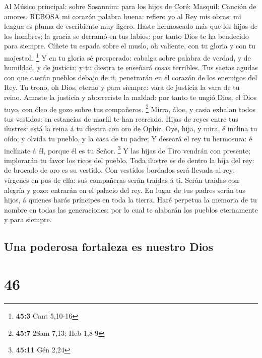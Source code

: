  Al Músico principal: sobre Sosannim: para los hijos de
Coré: Masquil: Canción de amores. REBOSA mi corazón palabra buena:
refiero yo al Rey mis obras: mi lengua es pluma de escribiente muy
ligero.  Haste hermoseado más que los hijos de los hombres;
la gracia se derramó en tus labios: por tanto Dios te ha bendecido para
siempre.  Cíñete tu espada sobre el muslo, oh valiente, con
tu gloria y con tu majestad. \footnote{\textbf{45:3} Cant 5,10-16}
 Y en tu gloria sé prosperado: cabalga sobre palabra de
verdad, y de humildad, y de justicia; y tu diestra te enseñará cosas
terribles.  Tus saetas agudas con que caerán pueblos debajo
de ti, penetrarán en el corazón de los enemigos del Rey.  Tu
trono, oh Dios, eterno y para siempre: vara de justicia la vara de tu
reino.  Amaste la justicia y aborreciste la maldad: por
tanto te ungió Dios, el Dios tuyo, con óleo de gozo sobre tus
compañeros. \footnote{\textbf{45:7} 2Sam 7,13; Heb 1,8-9} 
Mirra, áloe, y casia exhalan todos tus vestidos: en estancias de marfil
te han recreado.  Hijas de reyes entre tus ilustres: está la
reina á tu diestra con oro de Ophir.  Oye, hija, y mira, é
inclina tu oído; y olvida tu pueblo, y la casa de tu padre;
 Y deseará el rey tu hermosura: é inclínate á él, porque él
es tu Señor. \footnote{\textbf{45:11} Gén 2,24}  Y las
hijas de Tiro vendrán con presente; implorarán tu favor los ricos del
pueblo.  Toda ilustre es de dentro la hija del rey: de
brocado de oro es su vestido.  Con vestidos bordados será
llevada al rey; vírgenes en pos de ella: sus compañeras serán traídas á
ti.  Serán traídas con alegría y gozo: entrarán en el
palacio del rey.  En lugar de tus padres serán tus hijos, á
quienes harás príncipes en toda la tierra.  Haré perpetua
la memoria de tu nombre en todas las generaciones: por lo cual te
alabarán los pueblos eternamente y para siempre.

\hypertarget{una-poderosa-fortaleza-es-nuestro-dios}{%
\subsection{Una poderosa fortaleza es nuestro
Dios}\label{una-poderosa-fortaleza-es-nuestro-dios}}

\hypertarget{section-45}{%
\section{46}\label{section-45}}

